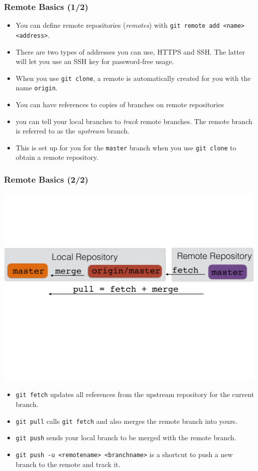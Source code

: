 \begin{frame}[fragile]
\frametitle{Remote Basics (1/2)}
\begin{itemize}
\item
You can define remote repositories (\emph{remotes}) with \lstinline{git remote add <name> <address>}.
\item There are two types of addresses you can use, HTTPS and SSH. The latter will let you use an SSH key for password-free usage.
\item When you use \lstinline{git clone}, a remote is automatically created for you with the name \texttt{origin}.
\item You can have references to copies of branches on remote repositories
\item you can tell your local branches to \emph{track} remote branches. The remote branch is referred to as the \emph{upstream} branch.
\item This is set up for you for the \lstinline{master} branch when you use \lstinline{git clone} to obtain a remote repository.
\end{itemize}
\end{frame}

\begin{frame}[fragile]
\frametitle{Remote Basics (2/2)}
\includegraphics[width=\textwidth]{fetchcartoon}
\begin{itemize}
\item \lstinline{git fetch} updates all references from the upstream repository for the current branch.
\item \lstinline{git pull} calls \lstinline{git fetch} and also merges the remote branch into yours.
\item \lstinline{git push} sends your local branch to be merged with the remote branch.
\item \lstinline{git push -u <remotename> <branchname>} is a shortcut to push a new branch to the remote and track it.
\end{itemize}
\end{frame}

